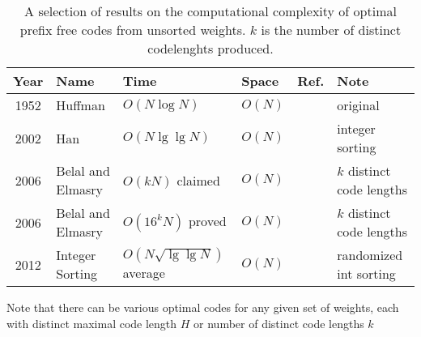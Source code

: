 \documentclass{llncs}
\begin{document}
\begin{LONG}
\begin{table}
{\label{tab:sortedWeightsPreviousResults}}
\end{table}
%
\begin{table}
\centering
\begin{tabular}{cp{4cm}p{4cm}p{2.5cm}p{1cm}p{3.5cm}}
Year & Name                  & Time                          & Space              & Ref.                                                                                                                              & Note                      \\ \hline
1952 & Huffman               & $O(N\log N)$                  & $O(N)$             & \cite{1952-IRE-AMethodForTheInstructionOfMinimumRedundancyCodes-Huffman}                                                          & original                  \\ \hline
2002 & Han                   & $O(N\lg\lg N)$                & $O(N)$             & \cite{2002-STOC-DeterministicSortingInOnlglgnTimeAndLinearSpace-Han,2004-JoA-DeterministicSortingInONLgLgNTimeAndLinearSpace-Han} & integer sorting           \\ \hline
2006 & Belal and Elmasry     & $O(kN)$ claimed               & $O(N)$             & \cite{2006-STACS-DistributionSensitiveConstructionOfMinimumRedundancyPrefixCodes-BelalElmasry}                                    & $k$ distinct code lengths \\
2006 & Belal and Elmasry     & $O(16^kN)$ proved             & $O(N)$             & \cite{2005-ARXIV-DistributionSensitiveConstructionOfMinimumRedundancyPrefixCodes-BelalElmasry}                                    & $k$ distinct code lengths \\ \hline
2012 & Integer Sorting       & $O(N\sqrt{\lg\lg N})$ average & $O(N)$             & \cite{2012-FOCS-IntegerSrtingInNSqrtLgLgNExpectedTimeAndLinearSpace-HanThorup}                                                    & randomized int sorting    \\
\end{tabular}
\caption{A selection of results on the computational complexity of optimal prefix free codes from unsorted weights.  $k$ is the number of distinct codelenghts produced.}
\label{tab:unsortedWeightsPreviousResults}
\end{table}
\end{LONG}

Note that there can be various optimal codes for any given set of weights, each with distinct maximal code length $H$ or number of distinct code lengths $k$
\end{document}
